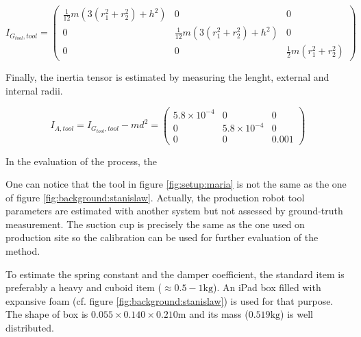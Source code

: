 \documentclass[/home/francois/latex/report/main.tex]{subfiles}
\begin{document}
\begin{equation}
  \label{eq:setup:tensor}
  I_{G_{tool}, tool} =
  \begin{pmatrix}
  \frac{1}{12} m(3(r_1^2+r_2^2) + h^2) & 0 & 0  \\
  0 & \frac{1}{12} m(3(r_1^2+r_2^2) + h^2) & 0 \\
  0 & 0 & \frac{1}{2} m(r_1^2+r_2^2)
  \end{pmatrix}
\end{equation}

Finally, the inertia tensor is estimated by measuring the lenght, external and internal radii.

\begin{equation*}
  I_{A, tool} = I_{G_{tool}, tool} - m d^2 =
  \begin{pmatrix}
  5.8 \times 10^{-4} & 0 & 0  \\
  0 & 5.8 \times 10^{-4} & 0 \\
  0 & 0 & 0.001
  \end{pmatrix}
\end{equation*}


 In the evaluation of the process, the

One can notice that the tool in figure \ref{fig:setup:maria} is not the same as the one of figure \ref{fig:background:stanislaw}. Actually, the production robot tool parameters are estimated with another system but not assessed by ground-truth measurement. The suction cup is precisely the same as the one used on production site so the calibration can be used for further evaluation of the method.

To estimate the spring constant and the damper coefficient, the standard item is preferably a heavy and cuboid item ($\approx 0.5-1 \si{\kilogram}$). An iPad box filled with expansive foam (cf. figure \ref{fig:background:stanislaw}) is used for that purpose. The shape of box is $0.055 \times 0.140 \times 0.210 \si{\meter}$ and its mass ($0.519 \si{\kilogram}$) is well distributed.
\end{document}
